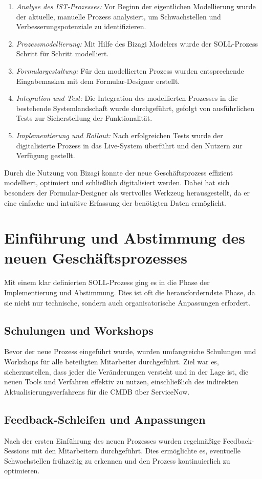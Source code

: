 \documentclass[12pt, a4paper]{article}
\begin{document}
\begin{enumerate}
\item \textit{Analyse des IST-Prozesses:} Vor Beginn der eigentlichen Modellierung wurde der aktuelle, manuelle Prozess analysiert, um Schwachstellen und 
Verbesserungspotenziale zu identifizieren.
\item \textit{Prozessmodellierung:} Mit Hilfe des Bizagi Modelers wurde der SOLL-Prozess Schritt für Schritt modelliert.
\item \textit{Formulargestaltung:} Für den modellierten Prozess wurden entsprechende Eingabemasken mit dem Formular-Designer erstellt.
\item \textit{Integration und Test:} Die Integration des modellierten Prozesses in die bestehende Systemlandschaft wurde durchgeführt, gefolgt von ausführlichen 
Tests zur Sicherstellung der Funktionalität.
\item \textit{Implementierung und Rollout:} Nach erfolgreichen Tests wurde der digitalisierte Prozess in das Live-System überführt und den Nutzern zur Verfügung gestellt.
\end{enumerate}

Durch die Nutzung von Bizagi konnte der neue Geschäftsprozess effizient modelliert, optimiert und schließlich digitalisiert werden. Dabei hat sich besonders der Formular-Designer als wertvolles Werkzeug herausgestellt, da er eine einfache und intuitive Erfassung der benötigten Daten ermöglicht.


\section{Einführung und Abstimmung des neuen Geschäftsprozesses}

Mit einem klar definierten SOLL-Prozess ging es in die Phase der Implementierung und Abstimmung. Dies ist oft die herausforderndste Phase, da sie nicht nur technische, 
sondern auch organisatorische Anpassungen erfordert.

\subsection{Schulungen und Workshops}

Bevor der neue Prozess eingeführt wurde, wurden umfangreiche Schulungen und Workshops für alle beteiligten Mitarbeiter durchgeführt. Ziel war es, sicherzustellen, 
dass jeder die Veränderungen versteht und in der Lage ist, die neuen Tools und Verfahren effektiv zu nutzen, einschließlich des indirekten Aktualisierungsverfahrens für die 
CMDB über ServiceNow.

\subsection{Feedback-Schleifen und Anpassungen}

Nach der ersten Einführung des neuen Prozesses wurden regelmäßige Feedback-Sessions mit den Mitarbeitern durchgeführt. Dies ermöglichte es, eventuelle Schwachstellen 
frühzeitig zu erkennen und den Prozess kontinuierlich zu optimieren.
\end{document}
